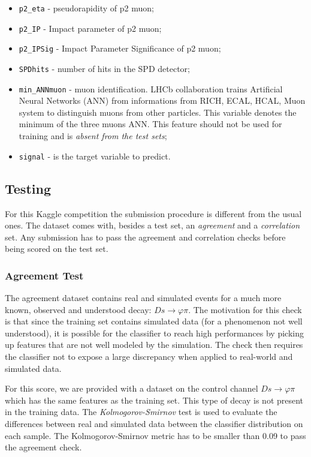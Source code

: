 \documentclass[11pt]{article}
\begin{document}
\begin{itemize}
	\item \texttt{p2\_eta} - pseudorapidity of p2 muon;
	\item \texttt{p2\_IP} - Impact parameter of p2 muon;
	\item \texttt{p2\_IPSig} - Impact Parameter Significance of p2 muon;
	\item \texttt{SPDhits} - number of hits in the SPD detector;
	\item \texttt{min\_ANNmuon} - muon identification. LHCb collaboration trains
					Artificial Neural Networks (ANN) from informations from RICH, ECAL,
					HCAL, Muon system to distinguish muons from other particles. This
					variable denotes the minimum of the three muons ANN. This feature
					should not be used for training and is \textit{absent from the test
					sets};
	\item \texttt{signal} - is the target variable to predict.
\end{itemize}

\subsection{Testing}
For this Kaggle competition the submission procedure is different from the usual
ones. The dataset comes with, besides a test set, an \textit{agreement} and a
\textit{correlation} set. Any submission has to pass the agreement and
correlation checks before being scored on the test set.

\subsubsection{Agreement Test}
\label{sec:agreement}
The agreement dataset contains real and simulated events for a much more known,
observed and understood decay: $Ds \rightarrow \varphi\pi$. The motivation for
this check is that since the training set contains simulated data (for a
phenomenon not well understood), it is possible for the classifier to reach high
performances by picking up features that are not well modeled by the simulation.
The check then requires the classifier not to expose a large discrepancy when
applied to real-world and simulated data.

For this score, we are provided with a dataset on the control channel $Ds
\rightarrow \varphi\pi$ which has the same features as the training set. This
type of decay is not present in the training data. The
\textit{Kolmogorov-Smirnov} test is used to evaluate the differences between
real and simulated data between the classifier distribution on each sample.
The Kolmogorov-Smirnov metric has to be smaller than 0.09 to pass the agreement
check.
\end{document}

